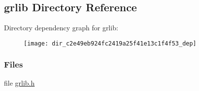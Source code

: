 \subsection{grlib Directory Reference}
\label{dir_c2e49eb924fc2419a25f41e13c1f4f53}
Directory dependency graph for grlib\+:
\nopagebreak
\begin{figure}[H]
\begin{center}
\leavevmode
\texttt{[image: dir\_c2e49eb924fc2419a25f41e13c1f4f53\_dep]}
\end{center}
\end{figure}
\subsubsection*{Files}
\begin{DoxyCompactItemize}
\item 
file \hyperlink{grlib_8h}{grlib.\+h}
\end{DoxyCompactItemize}
